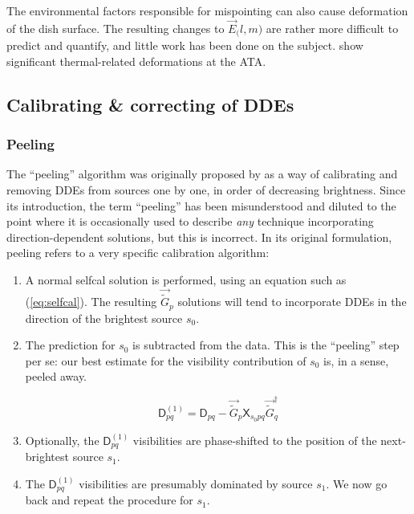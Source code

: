 \documentclass[]{aa}
\newcommand{\jones}[2]{\vec {#1}_{#2}}
\newcommand{\jonesT}[2]{\vec {#1}^\dagger_{#2}}
\newcommand{\coh}[2]{\mathsf{{#1}}_{{#2}}}
\begin{document}
The environmental factors responsible for mispointing can also cause deformation of the dish surface. The resulting changes to $\jones{E}(l,m)$ are rather more difficult to predict and quantify, and little work has been done on the subject. \citet{Harp:ATA-beams} show significant thermal-related deformations at the ATA.

\subsection{Calibrating \& correcting of DDEs\label{sec:cal-DDE}}

\subsubsection{Peeling\label{sec:peeling}}

The ``peeling'' algorithm was originally proposed by \citet{JEN:peeling} as a way of calibrating and removing DDEs from sources one by one, in order of decreasing brightness. Since its introduction, the term ``peeling'' has been misunderstood and diluted to the point where it is occasionally used to describe {\em any} technique incorporating direction-dependent solutions, but this is incorrect. In its original formulation, peeling refers to a very specific calibration algorithm:

\begin{enumerate}

\item A normal selfcal solution is performed, using an equation such as (\ref{eq:selfcal}). The resulting $\jones{\tilde{G}}{p}$ solutions will tend to incorporate DDEs in the direction of the brightest source $s_0$.

\item The prediction for $s_0$ is subtracted from the data. This is the ``peeling'' step per se: our best estimate for the visibility contribution of $s_0$ is, in a sense, peeled away.

\[
\coh{D}{pq}^{(1)} = \coh{D}{pq} - \jones{\tilde{G}}{p} \coh{X}{s_0 pq} \jonesT{\tilde{G}}{q}
\]

\item Optionally, the $\coh{D}{pq}^{(1)}$ visibilities are phase-shifted to the position of the next-brightest source $s_1$.
 
\item The $\coh{D}{pq}^{(1)}$ visibilities are presumably dominated by source $s_1$. We now go back and repeat the procedure for $s_1$.

\end{enumerate}
\end{document}
